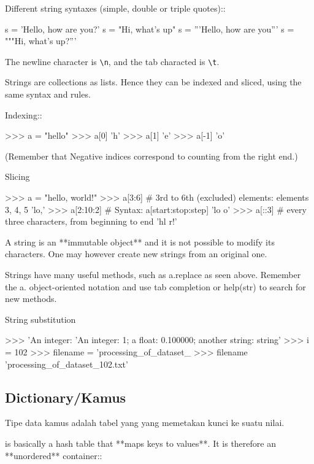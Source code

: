 \documentclass[a4paper,11pt]{extarticle}
\begin{document}
Different string syntaxes (simple, double or triple quotes)::
\begin{pyconcode}
s = 'Hello, how are you?'
s = "Hi, what's up"
s = '''Hello, 
       how are you'''
s = """Hi,
   what's up?'''
\end{pyconcode}

The newline character is \verb|\n|, and the tab characted is
\verb|\t|.

Strings are collections as lists. Hence they can be indexed and sliced,
using the same syntax and rules.

Indexing::
\begin{pyconcode}
>>> a = "hello"
>>> a[0]
'h'
>>> a[1]
'e'
>>> a[-1]
'o'
\end{pyconcode}

(Remember that Negative indices correspond to counting from the right
end.)

Slicing

\begin{pyconcode}
>>> a = "hello, world!"
>>> a[3:6] # 3rd to 6th (excluded) elements: elements 3, 4, 5
'lo,'
>>> a[2:10:2] # Syntax: a[start:stop:step]
'lo o'
>>> a[::3] # every three characters, from beginning to end 
'hl r!'
\end{pyconcode}

A string is an **immutable object** and it is not possible to modify its
characters. One may however create new strings from an original one.

Strings have many useful methods, such as a.replace as seen above.
Remember the a. object-oriented notation and use tab completion or
help(str) to search for new methods.


String substitution
\begin{pyconcode}
>>> 'An integer: %
    'An integer: 1; a float: 0.100000; another string: string'
>>> i = 102
>>> filename = 'processing_of_dataset_%
>>> filename
'processing_of_dataset_102.txt'
\end{pyconcode}

\subsection{Dictionary/Kamus}

Tipe data kamus adalah tabel yang yang memetakan kunci ke suatu nilai.

is basically a hash table that **maps keys to values**. It
is therefore an **unordered** container::
\end{document}
